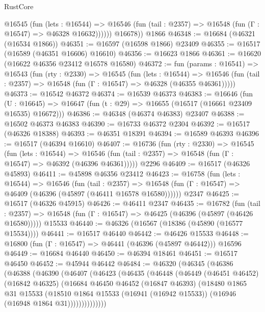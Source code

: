 \begin{lexlean}{RustCore}
\begin{coremodule}
            @16545
              (fun (lets : @16544) =>
              @16546 (fun (tail : @2357) => @16548 (fun (Γ : @16547) => @46328 @16632))))))
        @16678))
    @1866
@46348 := @16684 (@46321 (@16534 @1866))
@46351 := @16597 (@16598 @1866) @23409
@46355 := @16517 (@16589 (@46351 @16606) @16610)
@46356 := @16623 @1866
@46361 := @16620 (@16622 @46356 @23412 @16578 @16580)
@46372 := fun (params : @16541) =>
  @16543
    (fun (rty : @2330) =>
    @16545
      (fun (lets : @16544) =>
      @16546 (fun (tail : @2357) => @16548 (fun (Γ : @16547) => @46328 (@46355 @46361)))))
@46373 := @16542 @46372
@46374 := @16539 @46373
@46383 := @16646
    (fun (U : @16645) => @16647 (fun (t : @29) => @16655 (@16517 (@16661 @23409 @16535) @16672)))
@46386 := @46348 (@46374 @46383) @23407
@46388 := @16502 @46373 @46383
@46390 := @16733 @46372 @2304
@46392 := @16517 (@46326 @18388)
@46393 := @46351 @18391
@46394 := @16589 @46393
@46396 := @16517 (@46394 @16610)
@46407 := @16736
    (fun (rty : @2330) =>
    @16545
      (fun (lets : @16544) =>
      @16546 (fun (tail : @2357) => @16548 (fun (Γ : @16547) => @46392 (@46396 @46361)))))
    @2296
@46409 := @16517 (@46326 @45893)
@46411 := @45898 @46356 @23412
@46423 := @16758
    (fun (lets : @16544) =>
    @16546
      (fun (tail : @2357) =>
      @16548 (fun (Γ : @16547) => @46409 (@46396 (@45897 (@46411 @16578 @16580))))))
    @2347
@46425 := @16517 (@46326 @45915)
@46426 := @46411 @2347
@46435 := @16782
    (fun (tail : @2357) => @16548 (fun (Γ : @16547) => @46425 (@46396 (@45897 (@46426 @16580)))))
    @15533
@46440 := @46326 (@16567 (@18386 (@45890 (@16577 @15534))))
@46441 := @16517 @46440
@46442 := @46426 @15533
@46448 := @16800 (fun (Γ : @16547) => @46441 (@46396 (@45897 @46442))) @16596
@46449 := @16684 @46440
@46450 := @46394 @18461
@46451 := @16517 @46450
@46452 := @45944 @46442
@46484 := @46320
    (@46345
      (@46386
        (@46388
          (@46390
            (@46407
              (@46423
                (@46435
                  (@46448
                    (@46449
                      (@46451 @46452)
                      (@16842 @46325)
                      (@16684
                        @46450
                        @46452
                        (@16847 @46393)
                        (@18480
                          @1865
                          @31
                          @15533
                          (@18510
                            @1864
                            @15533
                            (@16941 (@16942 @15533))
                            (@16946 (@16948 @1864 @31))))))))))))))

\end{coremodule}
\end{lexlean}
